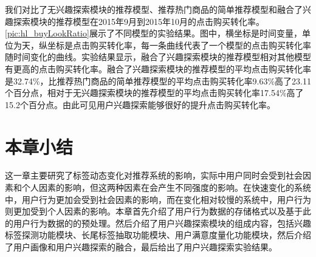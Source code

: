   我们对比了无兴趣探索模块的推荐模型、推荐热门商品的简单推荐模型和融合了兴趣探索模块的推荐模型在2015年9月到2015年10月的点击购买转化率。\autoref{pic:hl_buyLookRatio}展示了不同模型的实验结果。图中，横坐标是时间变量，单位为天，纵坐标是点击购买转化率，每一条曲线代表了一个模型的点击购买转化率随时间变化的曲线。实验结果显示，融合了兴趣探索模块的推荐模型相对其他模型有更高的点击购买转化率。融合了兴趣探索模块的推荐模型的平均点击购买转化率是32.74\%，比推荐热门商品的简单推荐模型的平均点击购买转化率9.63\%高了23.11个百分点，相对于无兴趣探索模块的推荐模型的平均点击购买转化率17.54\%高了15.2个百分点。由此可见用户兴趣探索能够很好的提升点击购买转化率。
  \begin{figure}
  \centering
    \label{pic:hl_buyLookRatio}
  \end{figure}

\section{本章小结}
这一章主要研究了标签动态变化对推荐系统的影响，实际中用户同时会受到社会因素和个人因素的影响，但这两种因素在会产生不同强度的影响。在快速变化的系统中，用户行为更加会受到社会因素的影响，而在变化相对较慢的系统中，用户行为则更加受到个人因素的影响。本章首先介绍了用户行为数据的存储格式以及基于此的用户行为数据的的预处理。然后介绍了用户兴趣探索模块的组成内容，包括兴趣标签探测功能模块、长尾标签抽取功能模块、用户满意度量化功能模块，然后介绍了用户画像和用户兴趣探索的融合，最后给出了用户兴趣探索实验结果。